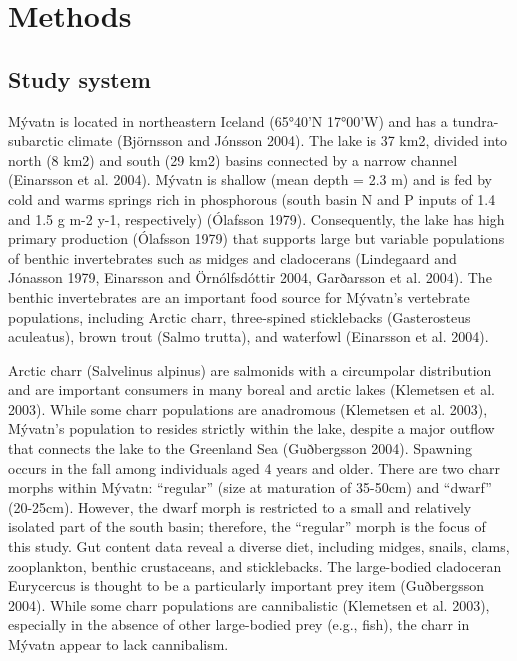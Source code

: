 \section*{Methods} 

\subsection*{Study system} 

Mývatn is located in northeastern Iceland (65°40’N 17°00’W) 
and has a tundra-subarctic climate (Björnsson and Jónsson 2004). 
The lake is 37 km2, divided into north (8 km2) and south (29 km2) basins 
connected by a narrow channel (Einarsson et al. 2004). 
Mývatn is shallow (mean depth = 2.3 m) and is fed by cold and 
warms springs rich in phosphorous 
(south basin N and P inputs of 1.4 and 1.5 g m-2 y-1, respectively) (Ólafsson 1979). 
Consequently, the lake has high primary production 
(Ólafsson 1979) that supports large but variable populations of benthic invertebrates 
such as midges and cladocerans 
(Lindegaard and Jónasson 1979, Einarsson and Örnólfsdóttir 2004, Garðarsson et al. 2004). 
The benthic invertebrates are an important food source for Mývatn’s vertebrate populations, 
including Arctic charr, three-spined sticklebacks (Gasterosteus aculeatus), 
brown trout (Salmo trutta), and waterfowl (Einarsson et al. 2004). 

Arctic charr (Salvelinus alpinus) are salmonids with a circumpolar distribution 
and are important consumers in many boreal and arctic lakes (Klemetsen et al. 2003). 
While some charr populations are anadromous (Klemetsen et al. 2003), 
Mývatn’s population to resides strictly within the lake, 
despite a major outflow that connects the lake to the Greenland Sea (Guðbergsson 2004). 
Spawning occurs in the fall among individuals aged 4 years and older. 
There are two charr morphs within Mývatn: “regular” (size at maturation of 35-50cm) 
and “dwarf” (20-25cm). However, the dwarf morph is restricted to a small 
and relatively isolated part of the south basin; therefore, 
the “regular” morph is the focus of this study. 
Gut content data reveal a diverse diet, including midges, snails, clams, zooplankton, 
benthic crustaceans, and sticklebacks. 
The large-bodied cladoceran Eurycercus is thought to be a particularly important prey item 
(Guðbergsson 2004). 
While some charr populations are cannibalistic (Klemetsen et al. 2003), 
especially in the absence of other large-bodied prey (e.g., fish), 
the charr in Mývatn appear to lack cannibalism. 


